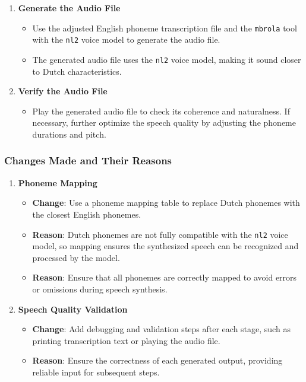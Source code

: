 \documentclass{../labbook}
\begin{document}
\begin{solution}
\begin{enumerate}
    \item \textbf{Generate the Audio File}
    \begin{itemize}
        \item Use the adjusted English phoneme transcription file and the \texttt{mbrola} tool with the \texttt{nl2} voice model to generate the audio file.
        \item The generated audio file uses the \texttt{nl2} voice model, making it sound closer to Dutch characteristics.
    \end{itemize}

    \item \textbf{Verify the Audio File}
    \begin{itemize}
        \item Play the generated audio file to check its coherence and naturalness. If necessary, further optimize the speech quality by adjusting the phoneme durations and pitch.
    \end{itemize}
\end{enumerate}

\subsubsection*{Changes Made and Their Reasons}
\begin{enumerate}
    \item \textbf{Phoneme Mapping}
    \begin{itemize}
        \item \textbf{Change}: Use a phoneme mapping table to replace Dutch phonemes with the closest English phonemes.
        \item \textbf{Reason}: Dutch phonemes are not fully compatible with the \texttt{nl2} voice model, so mapping ensures the synthesized speech can be recognized and processed by the model.
        \item \textbf{Reason}: Ensure that all phonemes are correctly mapped to avoid errors or omissions during speech synthesis.
    \end{itemize}

    \item \textbf{Speech Quality Validation}
    \begin{itemize}
        \item \textbf{Change}: Add debugging and validation steps after each stage, such as printing transcription text or playing the audio file.
        \item \textbf{Reason}: Ensure the correctness of each generated output, providing reliable input for subsequent steps.
    \end{itemize}
\end{enumerate}
\end{solution}
\end{document}
